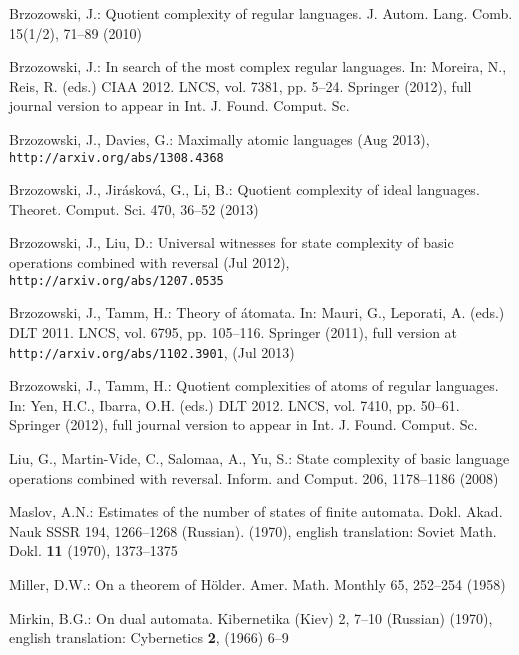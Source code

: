 \documentclass{llncs}
\begin{document}
\providecommand{\noopsort}[1]{}
\begin{thebibliography}{10}
\providecommand{\url}[1]{\texttt{#1}}
\providecommand{\urlprefix}{URL }

Brzozowski, J.: Quotient complexity of regular languages. J. Autom. Lang. Comb.
   15(1/2),  71--89 (2010)

Brzozowski, J.: In search of the most complex regular languages. In: Moreira,
  N., Reis, R. (eds.) CIAA 2012. LNCS, vol. 7381, pp. 5--24. Springer (2012),
  full journal version to appear in Int. J. Found. Comput. Sc.

Brzozowski, J., Davies, G.: Maximally atomic languages (Aug 2013), {\small\tt
  http://arxiv.org/abs/1308.4368}

Brzozowski, J., Jir{\'a}skov{\'a}, G., Li, B.: Quotient complexity of ideal
  languages. Theoret. Comput. Sci.  470,  36--52 (2013)

Brzozowski, J., Liu, D.: Universal witnesses for state complexity of basic
  operations combined with reversal (Jul 2012), {\small\tt
  http://arxiv.org/abs/1207.0535}

Brzozowski, J., Tamm, H.: Theory of \'atomata. In: Mauri, G., Leporati, A.
  (eds.) DLT 2011. LNCS, vol. 6795, pp. 105--116. Springer (2011), full version
  at {\small\tt http://arxiv.org/abs/1102.3901}, (Jul 2013)

Brzozowski, J., Tamm, H.: Quotient complexities of atoms of regular languages.
  In: Yen, H.C., Ibarra, O.H. (eds.) DLT 2012. LNCS, vol. 7410, pp. 50--61.
  Springer (2012), full journal version to appear in Int. J. Found. Comput. Sc.

Liu, G., Martin-Vide, C., Salomaa, A., Yu, S.: State complexity of basic
  language operations combined with reversal. Inform. and Comput.  206,
  1178--1186 (2008)

Maslov, A.N.: Estimates of the number of states of finite automata. Dokl. Akad.
  Nauk SSSR  194,  1266--1268 (Russian). (1970), english translation: Soviet
  Math. Dokl. {\bf 11} (1970), 1373--1375

Miller, D.W.: On a theorem of {H}\"older. Amer. Math. Monthly  65,  252--254
  (1958)

Mirkin, B.G.: On dual automata. Kibernetika (Kiev)  2,  7--10 (Russian) (1970),
  english translation: Cybernetics {\bf 2}, (1966) 6--9


\end{thebibliography}
\end{document}
